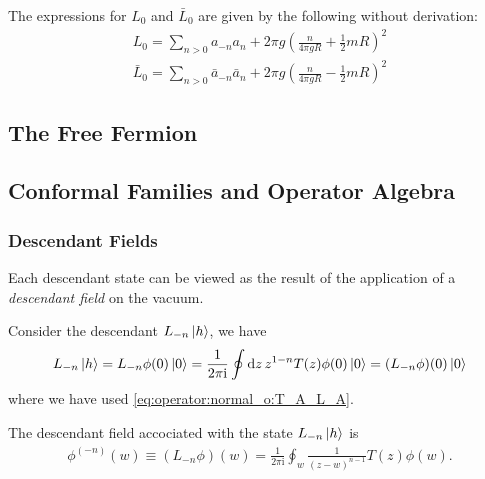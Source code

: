 \documentclass[10pt]{article}
\newcommand{\ii}{\mathrm{i}}
\begin{document}
The expressions for $L_0$ and $\bar{L}_0$ are given by the following without derivation:
\begin{subequations}
    \begin{align}
        L_0=\sum_{n>0}a_{-n}a_{n}+2\pi g\left(\frac{n}{4\pi g R}+\frac{1}{2}mR\right)^2\\
        \bar{L}_0=\sum_{n>0}\bar{a}_{-n}\bar{a}_{n}+2\pi g\left(\frac{n}{4\pi g R}-\frac{1}{2}mR\right)^2
    \end{align}
\end{subequations}
\subsection{The Free Fermion} 
\subsection{Conformal Families and Operator Algebra}
\subsubsection{Descendant Fields}
\begin{intu}
    Each descendant state can be viewed as the result of the application of a \textit{descendant field} on the vacuum.
\end{intu}
\begin{example}
    Consider the descendant $L_{-n}\ket{h}$, we have 
    \begin{align}
        L_{-n}\ket{h}=L_{-n}\phi(0)\ket{0}=\frac{1}{2\pi\ii}\oint\dd{z}z^{1-n}T(z)\phi(0)\ket{0}=(L_{-n}\phi)(0)\ket{0}
    \end{align}
    where we have used \cref{eq:operator:normal_o:T_A_L_A}.
\end{example}
\begin{definition}\label{def:descendant_field}
    The descendant field accociated with the state $L_{-n}\ket{h}$ is 
    \begin{align}
        \phi^{(-n)}(w)\equiv(L_{-n}\phi)(w)=\frac{1}{2\pi\ii}\oint_w\frac{1}{(z-w)^{n-1}}T(z)\phi(w).
    \end{align}
\end{definition}
\end{document}
